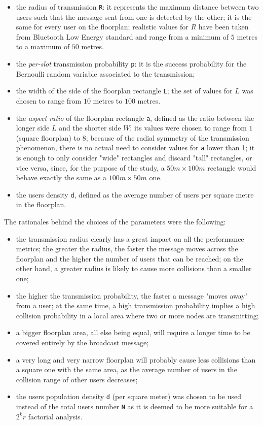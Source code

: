 \begin{itemize}
	\item the radius of transmission \colorbox{gray!30}{\large \texttt{R}}: it
	represents the maximum distance between two users such that the message
	sent from one is detected by the other; it is the same for every user on
	the floorplan; realistic values for $R$ have been taken from Bluetooth Low
	Energy standard and range from a minimum of $5$ metres to a maximum of $50$
	metres.
	\item the \textit{per-slot} transmission probability
	\colorbox{gray!30}{\large \texttt{p}}: it is the success probability for the
	Bernoulli random variable associated to the transmission;
    \item the width of the side of the floorplan rectangle
    \colorbox{gray!30}{\large \texttt{L}}; the set of values for $L$ was chosen
    to range from $10$ metres to $100$ metres.
	\item the \textit{aspect ratio} of the floorplan rectangle
	\colorbox{gray!30}{\large \texttt{a}}, defined as the ratio between the
	longer side $L$ and the shorter side $W$; its values were chosen to range
	from $1$ (square floorplan) to $8$; because of the radial symmetry of the
	transmission phenomenon, there is no actual need to consider values for
	\texttt{a} lower than 1; it is enough to only consider "wide" rectangles and
	discard "tall" rectangles, or vice versa, since, for the purpose of the
	study, a $50m \times 100m$ rectangle would behave exactly the same as a
	$100m \times 50m$ one.
	\item the users density \colorbox{gray!30}{\large \texttt{d}}, defined
	as the average number of users per square metre in the floorplan.
\end{itemize}
The rationales behind the choices of the parameters were the following:
\begin{itemize}
    \item the transmission radius clearly has a great impact on all the
    performance metrics; the greater the radius, the faster the message moves
    across the floorplan and the higher the number of users that can be reached;
    on the other hand, a greater radius is likely to cause more collisions than
    a smaller one;
    \item the higher the transmission probability, the faster a message "moves
    away" from a user; at the same time, a high transmission probability implies
    a high collision probability in a local area where two or more nodes are
    transmitting;
    \item a bigger floorplan area, all else being equal, will require a longer
    time to be covered entirely by the broadcast message;
    \item a very long and very narrow floorplan will probably cause less
    collisions than a square one with the same area, as the average number of
    users in the collision range of other users decreases;
    \item the users population density \texttt{d} (per square meter) was chosen
    to be used instead of the total users number \texttt{N} as it is deemed to
    be more suitable for a $2^{k}r$ factorial analysis.
\end{itemize}
